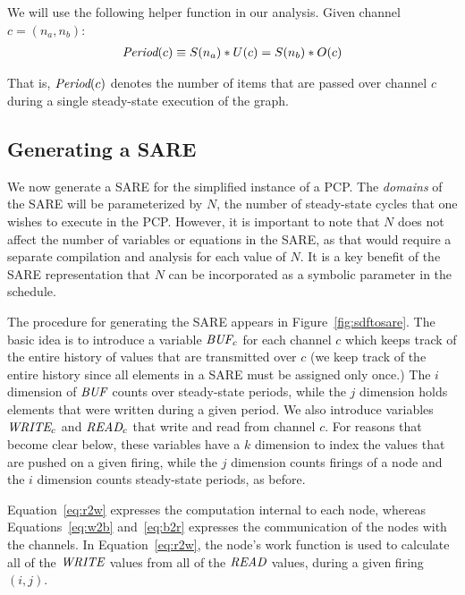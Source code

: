 We will use the following helper function in our analysis.  Given
channel $c = (n_a, n_b)$:
\begin{align*}
\mbox{\it Period}(c) \equiv S(n_a) * U(c) = S(n_b) * O(c)
\end{align*}

That is, $\mbox{\it Period}(c)$ denotes the number of items that are passed
over channel $c$ during a single steady-state execution of the graph.

\subsection{Generating a SARE}
\label{sec:simplesare}

We now generate a SARE for the simplified instance of a PCP.  The {\it
domains} of the SARE will be parameterized by $N$, the number of
steady-state cycles that one wishes to execute in the PCP.  However,
it is important to note that $N$ does not affect the number of
variables or equations in the SARE, as that would require a separate
compilation and analysis for each value of $N$.  It is a key benefit
of the SARE representation that $N$ can be incorporated as a symbolic
parameter in the schedule.

The procedure for generating the SARE appears in
Figure~\ref{fig:sdftosare}.  The basic idea is to introduce a variable
$\mbox{\it BUF}_c$ for each channel $c$ which keeps track of the entire
history of values that are transmitted over $c$ (we keep track of the
entire history since all elements in a SARE must be assigned only
once.)  The $i$ dimension of $\mbox{\it BUF}$ counts over steady-state
periods, while the $j$ dimension holds elements that were written
during a given period.  We also introduce variables $\mbox{\it WRITE}_c$ and
$\mbox{\it READ}_c$ that write and read from channel $c$.  For reasons that
become clear below, these variables have a $k$ dimension to index the
values that are pushed on a given firing, while the $j$ dimension
counts firings of a node and the $i$ dimension counts steady-state
periods, as before.

Equation~\ref{eq:r2w} expresses the computation internal to each node,
whereas Equations~\ref{eq:w2b} and~\ref{eq:b2r} expresses the
communication of the nodes with the channels.  In
Equation~\ref{eq:r2w}, the node's work function is used to calculate
all of the $\mbox{\it WRITE}$ values from all of the $\mbox{\it READ}$ values,
during a given firing $(i,j)$. 

